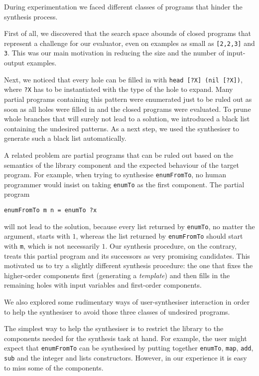 During experimentation we faced different classes of programs that hinder the synthesis process.

First of all, we discovered that the search space abounds of closed programs that represent a challenge for our evaluator, even on examples as small as \lstinline![2,2,3]! and \lstinline!3!. This was our main motivation in reducing the size and the number of input-output examples.

Next, we noticed that every hole can be filled in with \lstinline!head [?X] (nil [?X])!, where \lstinline!?X! has to be instantiated with the type of the hole to expand. Many partial programs containing this pattern were enumerated just to be ruled out as soon as all holes were filled in and the closed programs were evaluated. To prune whole branches that will surely not lead to a solution, we introduced a black list containing the undesired patterns. As a next step, we used the synthesiser to generate such a black list automatically.

A related problem are partial programs that can be ruled out based on the semantics of the library component and the expected behaviour of the target program. For example, when trying to synthesise \lstinline!enumFromTo!, no human programmer would insist on taking \lstinline!enumTo! as the first component. The partial program
\begin{lstlisting}[style=plain]
enumFromTo m n = enumTo ?x
\end{lstlisting}
will not lead to the solution, because every list returned by \lstinline!enumTo!, no matter the argument, starts with $1$, whereas the list returned by \lstinline!enumFromTo! should start with \lstinline!m!, which is not necessarily $1$. Our synthesis procedure, on the contrary, treats this partial program and its successors as very promising candidates.
This motivated us to try a slightly different synthesis procedure: the one that fixes the higher-order components first (generating a \emph{template}) and then fills in the remaining holes with input variables and first-order components.

We also explored some rudimentary ways of user-synthesiser interaction in order to help the synthesiser to avoid those three classes of undesired programs.

The simplest way to help the synthesiser is to restrict the library to the components needed for the synthesis task at hand. For example, the user might expect that \lstinline!enumFromTo! can be synthesised by putting together \lstinline!enumTo!, \lstinline!map!, \lstinline!add!, \lstinline!sub! and the integer and lists constructors. However, in our experience it is easy to miss some of the components.

